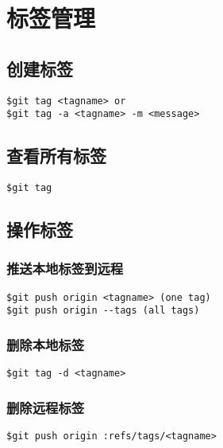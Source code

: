 \section{标签管理}
\subsection{创建标签}
\begin{lstlisting}
$git tag <tagname> or
$git tag -a <tagname> -m <message>
\end{lstlisting}

\subsection{查看所有标签}
\begin{lstlisting}
$git tag
\end{lstlisting}

\subsection{操作标签}
\subsubsection{推送本地标签到远程}
\begin{lstlisting}
$git push origin <tagname> (one tag)
$git push origin --tags (all tags)
\end{lstlisting}

\subsubsection{删除本地标签}
\begin{lstlisting}
$git tag -d <tagname>
\end{lstlisting}

\subsubsection{删除远程标签}
\begin{lstlisting}
$git push origin :refs/tags/<tagname>
\end{lstlisting}